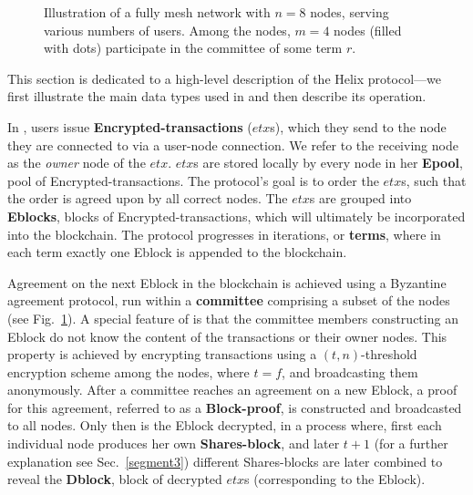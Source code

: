 \begin{figure}[!]
 \caption{Illustration of a \name fully mesh network with $n=8$ nodes, serving various numbers of users. Among the nodes, $m=4$ nodes (filled with dots) participate in the committee of some term $r$.
}\label{fig_illustration_network}
\end{figure}

This section is dedicated to a high-level description of the Helix protocol---we first illustrate the main data types used in \name and then describe its operation.

In \nameNS, users issue \textbf{Encrypted-transactions} ($etx$s), which they send to the node they are connected to via a user-node connection. We refer to the receiving node as the \emph{owner} node of the $etx$. $etx$s are stored locally by every node in her \textbf{Epool}, pool of Encrypted-transactions. The protocol's goal is to order the $etx$s, such that the order is agreed upon by all correct nodes. The $etx$s are grouped into \textbf{Eblocks}, blocks of Encrypted-transactions, which will ultimately be incorporated into the blockchain. The protocol progresses in iterations, or \textbf{terms}, where in each term exactly one Eblock is appended to the blockchain. 

Agreement on the next Eblock in the blockchain is achieved using a Byzantine agreement protocol, run within a \textbf{committee} comprising a subset of the nodes (see Fig.~\ref{fig_illustration_network}). A special feature of \name is that the committee members constructing an Eblock do not know the content of the transactions or their owner nodes. This property is achieved by encrypting transactions using a $(t,n)$-threshold encryption scheme among the nodes, where $t=f$, and broadcasting them anonymously.
After a committee reaches an agreement on a new Eblock, a proof for this agreement, referred to as a \textbf{Block-proof}, is constructed and broadcasted to all nodes. Only then is the Eblock decrypted, in a process where, first each individual node produces her own \textbf{Shares-block}, and later $t+1$ (for a further explanation see Sec.~\ref{segment3}) different Shares-blocks are later combined to reveal the \textbf{Dblock}, block of decrypted $etx$s (corresponding to the Eblock).						

